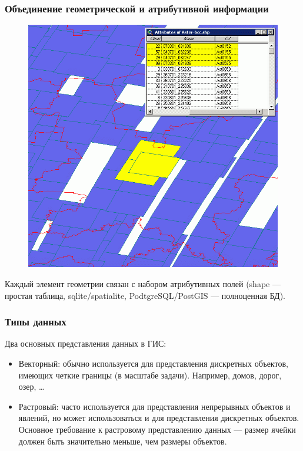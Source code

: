 \begin{frame}
    \frametitle{Объединение геометрической и атрибутивной информации}
    \begin{figure}[!ht]
        \begin{center}
            \includegraphics[width=0.55\columnwidth]{./introduction/img/attributes_and_geo}
        \end{center}
    \end{figure}
    Каждый элемент геометрии связан с набором атрибутивных полей (shape --- простая таблица, sqlite/spatialite, PodtgreSQL/PostGIS --- полноценная БД).
\end{frame}


\begin{frame}
    \frametitle{Типы данных}
    Два основных представления данных в ГИС:
    \begin{itemize}
        \item Векторный: обычно используется для представления дискретных объектов, имеющих четкие границы (в масштабе задачи). Например, домов, дорог, озер, \dots
        \item Растровый: часто используется для представления непрерывных объектов и явлений, но может использоваться и для представления дискретных объектов. Основное требование к растровому представлению данных --- размер ячейки должен быть
        значительно меньше, чем размеры объектов.
    \end{itemize}
\end{frame}

